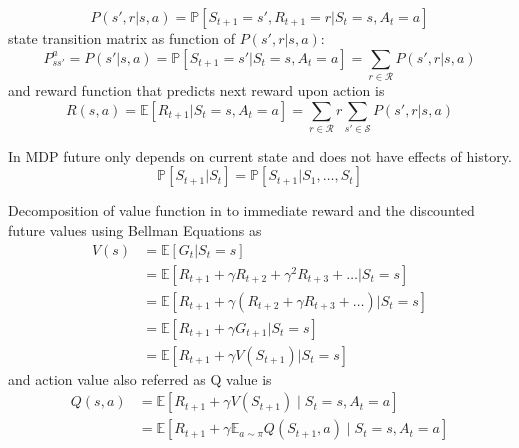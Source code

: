 \begin{equation}
P(s',r|s,a)=\mathbb{P} [S_{t+1} =s',R_{t+1} =r|S_{t} =s,A_{t} =a]
\end{equation}
state transition matrix as function of $\displaystyle P(s',r|s,a)$:
\begin{equation}
P^{a}_{ss'} =P(s'|s,a)=\mathbb{P} [S_{t+1} =s'|S_{t} =s,A_{t} =a]=\sum _{r\in \mathcal{R}} P(s',r|s,a)
\end{equation}
and reward function that predicts next reward upon action is
\begin{equation*}
R(s,a)=\mathbb{E} [R_{t+1} |S_{t} =s,A_{t} =a]=\sum _{r\in \mathcal{R}} r\sum _{s'\in \mathcal{S}} P(s',r|s,a)
\end{equation*}


In MDP future only depends on current state and does not have effects of history.
\begin{equation}
\mathbb{P} [S_{t+1} |S_{t} ]=\mathbb{P} [S_{t+1} |S_{1} ,\dotsc ,S_{t} ]
\end{equation}

Decomposition of value function in to immediate reward and the discounted future values using Bellman Equations as
\begin{equation}
\begin{aligned}
V(s) & =\mathbb{E} [G_{t} |S_{t} =s]\\
 & =\mathbb{E} [R_{t+1} +\gamma R_{t+2} +\gamma ^{2} R_{t+3} +\dotsc |S_{t} =s]\\
 & =\mathbb{E} [R_{t+1} +\gamma (R_{t+2} +\gamma R_{t+3} +\dotsc )|S_{t} =s]\\
 & =\mathbb{E} [R_{t+1} +\gamma G_{t+1} |S_{t} =s]\\
 & =\mathbb{E} [R_{t+1} +\gamma V(S_{t+1} )|S_{t} =s]
\end{aligned}
\end{equation}
and action value also referred as Q value is 
\begin{equation}
\begin{aligned}
Q(s,a) & =\mathbb{E} [R_{t+1} +\gamma V(S_{t+1} )\mid S_{t} =s,A_{t} =a]\\
 & =\mathbb{E} [R_{t+1} +\gamma \mathbb{E}_{a\sim \pi } Q(S_{t+1} ,a)\mid S_{t} =s,A_{t} =a]
\end{aligned}
\end{equation}


